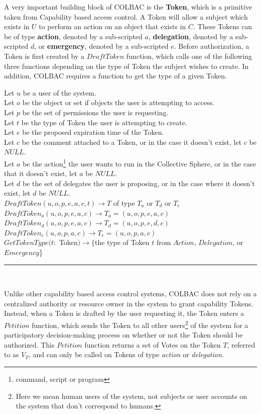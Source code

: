 \noindent A very important building block of COLBAC is the \textbf{Token}, which
is a primitive taken from Capability based access control. A Token will allow a
subject which exists in $U$ to perform an action on an object that exists in
$C$. These Tokens can be of type \textbf{action}, denoted by a sub-scripted $a$,
\textbf{delegation}, denoted by a sub-scripted $d$, or \textbf{emergency},
denoted by a sub-scripted $e$. Before authorization, a Token is first created by
a $DraftToken$ function, which calls one of the following three functions
depending on the type of Token the subject wishes to create. In addition, COLBAC
requires a function to get the type of a given Token.
\begin{definition}\label{def:Tokens}
Let $u$ be a user of the system.\\
Let $o$ be the object or set if objects the user is attempting to access.\\
Let $p$ be the set of permissions the user is requesting.\\
Let $t$ be the type of Token the user is attempting to create.\\
Let $e$ be the proposed expiration time of the Token.\\
Let $c$ be the comment attached to a Token, or in the case it doesn't exist,
let $c$ be $NULL$.\\
Let $a$ be the action\footnote{command, script or program} the user wants to run
in the Collective Sphere, or in the case that it doesn't exist, let $a$ be 
$NULL$.\\
Let $d$ be the set of delegates the user is proposing, or in the case where it
doesn't exist, let $d$ be $NULL$.\\
$DraftToken(u,o,p,e,a,c,t) \rightarrow T$ of type $T_{a}$ or $T_{d}$ or 
$T_{e}$\\
$DraftToken_{a}(u,o,p,e,a,c) \rightarrow T_{a} = (u,o,p,e,a,c)$\\
$DraftToken_{d}(u,o,p,e,a,c) \rightarrow T_{d} = (u,o,p,e,d,c)$\\
$DraftToken_{e}(u,o,p,a,c) \rightarrow T_{e} = (u,o,p,a,c)$\\
$GetTokenType(t:$ Token$) \rightarrow \{$the type of Token $t$ from $Action$,
$Delegation$, or $Emergency$\}
\hrule \mbox{}\\
\end{definition}

\noindent Unlike other capability based access control systems, COLBAC does not
rely on a centralized authority or resource owner in the system to grant
capability Tokens. Instead, when a Token is drafted by the user requesting it,
the Token enters a $Petition$ function, which sends the Token to all other
users\footnote{Here we mean human users of the system, not subjects or user
accounts on the system that don't correspond to humans.} of the system for a
participatory decision-making process on whether or not the Token should be
authorized. This $Petition$ function returns a set of Votes on the Token $T$,
referred to as $V_{T}$, and can only be called on Tokens of type \textit{action}
or \textit{delegation.}

